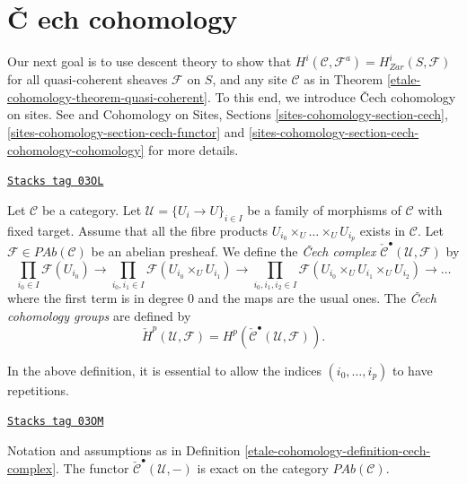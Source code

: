 \section{{\v C}
ech cohomology}
\label{etale-cohomology-section-cech-cohomology}

Our next goal is to use descent theory to show that
$H^i(\mathcal{C}, \mathcal{F}^a) = H_{Zar}^i(S, \mathcal{F})$
for all quasi-coherent sheaves $\mathcal{F}$ on $S$, and
any site $\mathcal{C}$ as in Theorem \ref{etale-cohomology-theorem-quasi-coherent}.
To this end, we introduce {\v C}ech cohomology on sites.
See \cite{ArtinTopologies} and
Cohomology on Sites, Sections \ref{sites-cohomology-section-cech},
\ref{sites-cohomology-section-cech-functor}
and \ref{sites-cohomology-section-cech-cohomology-cohomology}
for more details.

\begin{definition}
\label{etale-cohomology-definition-cech-complex}
\href{https://stacks.math.columbia.edu/tag/03OL}{\texttt{Stacks tag 03OL}}

Let $\mathcal{C}$ be a category. Let
$\mathcal{U} = \{U_i \to U\}_{i \in I}$ be a family of morphisms of
$\mathcal{C}$ with fixed target. Assume that all the fibre products
$U_{i_0} \times_U \ldots \times_U U_{i_p}$ exists in $\mathcal{C}$.
Let $\mathcal{F} \in \textit{PAb}(\mathcal{C})$ be an abelian
presheaf. We define the {\it {\v C}ech complex}
$\check{\mathcal{C}}^\bullet(\mathcal{U}, \mathcal{F})$ by
$$
\prod_{i_0 \in I} \mathcal{F}(U_{i_0}) \to
\prod_{i_0, i_1 \in I} \mathcal{F}(U_{i_0} \times_U U_{i_1}) \to
\prod_{i_0, i_1, i_2 \in I}
\mathcal{F}(U_{i_0} \times_U U_{i_1} \times_U U_{i_2}) \to \ldots
$$
where the first term is in degree 0 and the maps are the usual ones.
The {\it {\v C}ech cohomology groups} are defined by
$$
\check{H}^p(\mathcal{U}, \mathcal{F}) =
H^p(\check{\mathcal{C}}^\bullet(\mathcal{U}, \mathcal{F})).
$$
\end{definition}

In the above definition, it is essential to allow the indices
$(i_0, \ldots, i_p)$ to have repetitions.

\begin{lemma}
\label{etale-cohomology-lemma-cech-presheaves}
\href{https://stacks.math.columbia.edu/tag/03OM}{\texttt{Stacks tag 03OM}}

Notation and assumptions as in Definition \ref{etale-cohomology-definition-cech-complex}.
The functor $\check{\mathcal{C}}^\bullet(\mathcal{U}, -)$
is exact on the category $\textit{PAb}(\mathcal{C})$.
\end{lemma}

